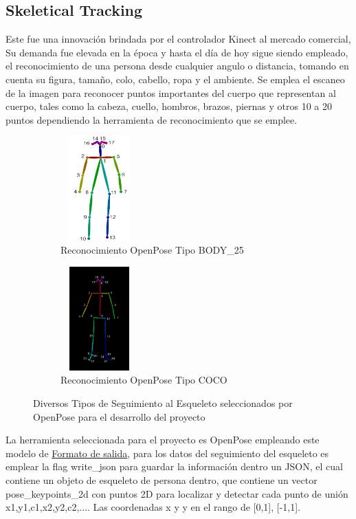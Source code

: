 \subsection{Skeletical Tracking}

Este fue una innovación brindada por el controlador Kinect al mercado comercial, Su demanda fue elevada en la época y hasta el día de hoy sigue siendo empleado, el reconocimiento de una persona desde cualquier angulo o distancia, tomando en cuenta su figura, tamaño, colo, cabello, ropa y el ambiente. Se emplea el escaneo de la imagen para reconocer puntos importantes del cuerpo que representan al cuerpo, tales como la cabeza, cuello, hombros, brazos, piernas y otros 10 a 20 puntos dependiendo la herramienta de reconocimiento que se emplee.


\begin{figure}[ht]
	\centering
	\begin{subfigure}{.5\textwidth}
		\centering
		\includegraphics[width=3cm,height=4cm]{./Images/openposet1.png}
		\caption{Reconocimiento OpenPose Tipo BODY\_25}
		\label{open1}
	\end{subfigure}%
	\begin{subfigure}{.5\textwidth}
		\centering
		\includegraphics[width=3cm,height=4cm]{./Images/openposet2.png}
		\caption{Reconocimiento OpenPose Tipo COCO}
		\label{open2}
	\end{subfigure}
	\caption{Diversos Tipos de Seguimiento al Esqueleto seleccionados por OpenPose para el desarrollo del proyecto}
	\label{exampleesqueletotrack}
\end{figure}

La herramienta seleccionada para el proyecto es OpenPose empleando este modelo de \href{https://github.com/CMU-Perceptual-Computing-Lab/openpose/blob/master/doc/output.md}{Formato de salida}, para los datos del seguimiento del esqueleto es emplear la flag write\_json para guardar la información dentro un JSON, el cual contiene un objeto de esqueleto de persona dentro, que contiene un vector pose\_keypoints\_2d con puntos 2D para localizar y detectar cada punto de unión x1,y1,c1,x2,y2,c2,.... Las coordenadas x y y en el rango de [0,1], [-1,1].

